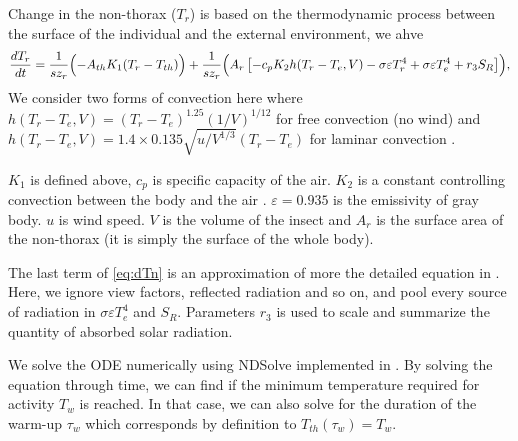 Change in the  non-thorax ($T_r$) is based on the thermodynamic process between the surface of the individual and the external environment, we ahve
\begin{equation} \label{eq:dTn} 
		\frac{dT_r}{dt} =  \frac{1}{s z_{r}} \Bigl( - A_{th} K_1(T_r - T_{th})  \Bigr)
			+ \frac{1}{s z_{r}} \Bigl( A_r \left[ - c_p K_2 h(T_r -T_e, V)- \sigma \varepsilon T_r^4 + \sigma \varepsilon T_e^4  + r_3 S_R  \right] \Bigr),
\end{equation}
We consider two forms of convection here where $ h(T_r -T_e, V) = (T_r- T_e)^{1.25} (1/V)^{1/12 }$ for free convection (no wind) and $ h(T_r -T_e, V) =  1.4 \times 0.135 \sqrt{u/V^{1/3}} (T_r- T_e) $ for laminar convection \citep{Campbell2012}.

$K_1$ is defined above, $c_p$ is specific capacity of the air. 
$K_2$ is a constant controlling convection between the body and the air \citep{Campbell2012}.
$\varepsilon = 0.935$  is the emissivity of gray body.
$u$ is wind speed.
$V$ is the volume of the insect and $A_r$ is the surface area of the  non-thorax (it is simply the surface of the whole body).

The last term of \cref{eq:dTn}  is an approximation of more the detailed equation in \citet{Campbell2012}.
Here, we ignore view factors, reflected radiation and so on, and pool every source of radiation in $ \sigma \varepsilon T_e^4$ and $S_R$. 
Parameters $r_3$ is used to scale and summarize the quantity of absorbed solar radiation.

We solve the ODE numerically using NDSolve implemented in \citet{Mathematica10}.
By solving the equation through time, we can find if the minimum temperature  required for activity $T_w$ is reached. %
In that case, we can also solve for the duration of the warm-up $\tau_w$ which corresponds by definition to $T_{th}(\tau_w) = T_w$. 


